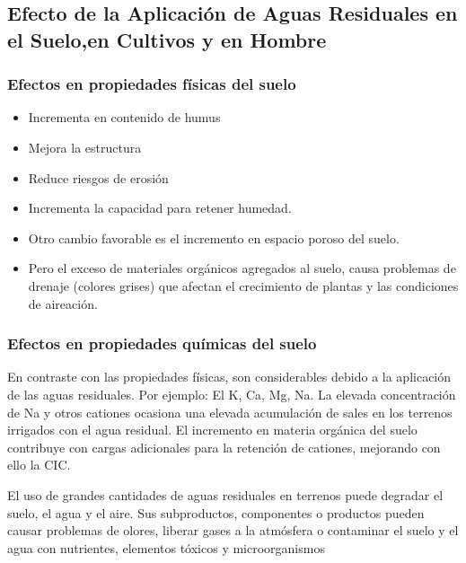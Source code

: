 
\subsection{Efecto de la Aplicación de Aguas Residuales en el Suelo,en Cultivos y en Hombre}

\subsubsection{Efectos en propiedades físicas del suelo}
\begin{itemize}
    \item Incrementa en contenido de humus
    \item Mejora la estructura
    \item Reduce riesgos de erosión 
    \item Incrementa la capacidad para retener humedad. 
    \item Otro cambio favorable es el incremento en espacio poroso del suelo.
    \item Pero el exceso de materiales orgánicos agregados al suelo, causa problemas de drenaje (colores grises) que afectan el crecimiento de plantas y las condiciones de aireación.    
\end{itemize}
\subsubsection{Efectos en propiedades químicas del suelo}
En contraste con las propiedades físicas, son considerables debido a la aplicación de las aguas residuales. Por ejemplo: El K, Ca, Mg, Na. La elevada concentración de Na y otros cationes ocasiona una elevada acumulación de sales en los terrenos irrigados con el agua residual. 
El incremento en materia orgánica del suelo contribuye con cargas adicionales para la retención de cationes, mejorando con ello la CIC.

El uso de grandes cantidades de aguas residuales en terrenos puede degradar el suelo, el agua y el aire. 
Sus subproductos, componentes o productos pueden causar problemas de olores, liberar gases a la atmósfera o contaminar el suelo y el agua con nutrientes, elementos tóxicos y microorganismos 

